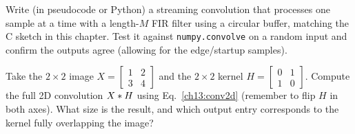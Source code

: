\begin{exercise}
\label{ch13:ex9}
Write (in pseudocode or Python) a streaming convolution that processes one
sample at a time with a length-$M$ FIR filter using a circular buffer, matching
the C sketch in this chapter. Test it against \texttt{numpy.convolve} on a
random input and confirm the outputs agree (allowing for the edge/startup
samples).
\end{exercise}

\begin{exercise}
\label{ch13:ex10}
Take the $2\times2$ image $X = \left[\begin{smallmatrix} 1 & 2 \\ 3 & 4
\end{smallmatrix}\right]$ and the $2\times2$ kernel $H =
\left[\begin{smallmatrix} 0 & 1 \\ 1 & 0 \end{smallmatrix}\right]$. Compute the
full 2D convolution $X \ast H$ using Eq.~\eqref{ch13:conv2d} (remember to flip
$H$ in both axes). What size is the result, and which output entry corresponds to
the kernel fully overlapping the image?
\end{exercise}
